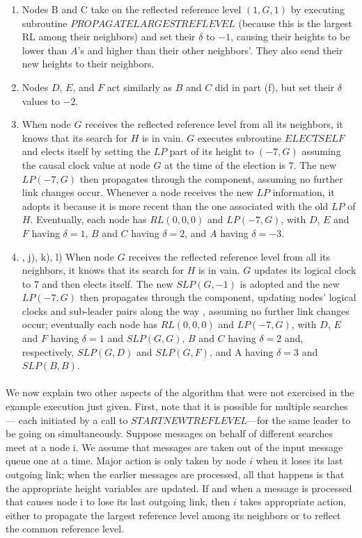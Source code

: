 \begin{enumerate}[label=\alph*)]
	\item Nodes B and C take on the reflected reference level $(1,G,1)$ by executing subroutine $PROPAGATELARGESTREFLEVEL$ (because this is the largest RL among their neighbors) and set their $\delta$ to $-1$, causing their heights to be lower than $A$’s and higher than their other neighbors’. They also send their new heights to their neighbors.
	\item Nodes $D$, $E$, and $F$ act similarly as $B$ and $C$ did in part (f), but set their $\delta$ values to $-2$.
	\item When node $G$ receives the reflected reference level from all its neighbors, it knows that its search for $H$ is in vain. $G$ executes subroutine $ELECTSELF$ and elects itself by setting the $LP$ part of its height to $(-7,G)$ assuming the causal clock value at node $G$ at the time of the election is $7$. The new $LP(-7,G)$ then propagates through the component, assuming no further link changes occur. Whenever a node receives the new $LP$ information, it adopts it because it is more recent than the one associated with the old $LP$ of $H$. Eventually, each node has $RL (0,0,0)$ and $LP (-7,G)$, with $D$, $E$ and $F$ having $\delta = 1$, $B$ and $C$ having $\delta = 2$, and $A$ having $\delta = -3$.
	\item , j), k), l) When node $G$ receives the reflected reference level from all its neighbors, it knows that its search for $H$ is in vain. $G$ updates its logical clock to $7$ and then elects itself. The new $SLP(G,-1)$ is adopted and the new $LP(-7,G)$ then propagates through the component, updating nodes’ logical clocks and sub-leader pairs along the way , assuming no further link changes occur; eventually each node has $RL(0,0,0)$ and $LP(-7,G)$, with $D$, $E$ and $F$ having $\delta = 1$ and $SLP(G,G)$, $B$ and $C$ having $\delta = 2$ and, respectively, $SLP(G,D)$ and $SLP(G,F)$, and A having $\delta = 3$ and $SLP(B,B)$.
\end{enumerate}
\paragraph{}We now explain two other aspects of the algorithm that were not exercised in the example execution just given. First, note that it is possible for multiple searches— each initiated by a call to $STARTNEWTREFLEVEL$—for the same leader to be going on simultaneously. Suppose messages on behalf of different searches meet at a node i. We assume that messages are taken out of the input message queue one at a time. Major action is only taken by node $i$ when it loses its last outgoing link; when the earlier messages are processed, all that happens is that the appropriate height variables are updated. If and when a message is processed that causes node i to lose its last outgoing link, then $i$ takes appropriate action, either to propagate the largest reference level among its neighbors or to reflect the common reference level.
